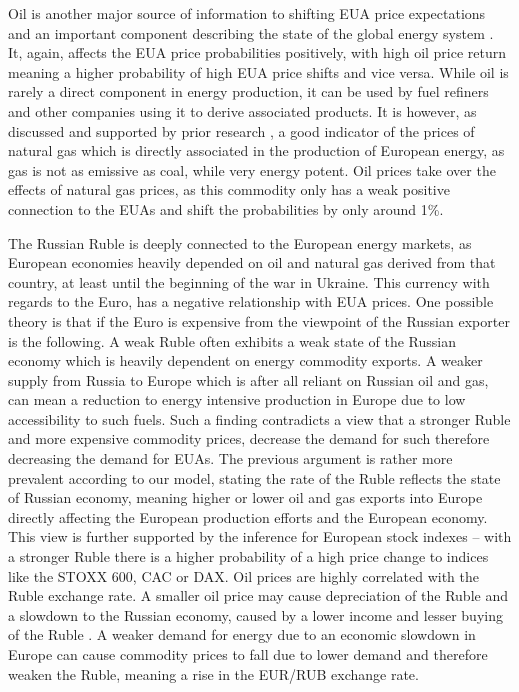 \documentclass[12pt, letterpaper]{article}
\begin{document}
Oil is another major source of information to shifting EUA price expectations and an important component describing the state of the global energy system \parencite{lovcha2021}. It, again, affects the EUA price probabilities positively, with high oil price return meaning a higher probability of high EUA price shifts and vice versa. While oil is rarely a direct component in energy production, it can be used by fuel refiners and other companies using it to derive associated products. It is however, as discussed and supported by prior research \parencite{lovcha2021}, a good indicator of the prices of natural gas which is directly associated in the production of European energy, as gas is not as emissive as coal, while very energy potent. Oil prices take over the effects of natural gas prices, as this commodity only has a weak positive connection to the EUAs and shift the probabilities by only around 1\%.

The Russian Ruble is deeply connected to the European energy markets, as European economies heavily depended on oil and natural gas derived from that country, at least until the beginning of the war in Ukraine. This currency with regards to the Euro, has a negative relationship with EUA prices. One possible theory is that if the Euro is expensive from the viewpoint of the Russian exporter is the following. A weak Ruble often exhibits a weak state of the Russian economy which is heavily dependent on energy commodity exports. A weaker supply from Russia to Europe which is after all reliant on Russian oil and gas, can mean a reduction to energy intensive production in Europe due to low accessibility to such fuels. Such a finding contradicts a view that a stronger Ruble and more expensive commodity prices, decrease the demand for such therefore decreasing the demand for EUAs. The previous argument is rather more prevalent according to our model, stating the rate of the Ruble reflects the state of Russian economy, meaning higher or lower oil and gas exports into Europe directly affecting the European production efforts and the European economy. This view is further supported by the inference for European stock indexes – with a stronger Ruble there is a higher probability of a high price change to indices like the STOXX 600, CAC or DAX. Oil prices are highly correlated with the Ruble exchange rate. A smaller oil price may cause depreciation of the Ruble and a slowdown to the Russian economy, caused by a lower income and lesser buying of the Ruble \parencite{bilan2018}. A weaker demand for energy due to an economic slowdown in Europe can cause commodity prices to fall due to lower demand and therefore weaken the Ruble, meaning a rise in the EUR/RUB exchange rate.
\end{document}
